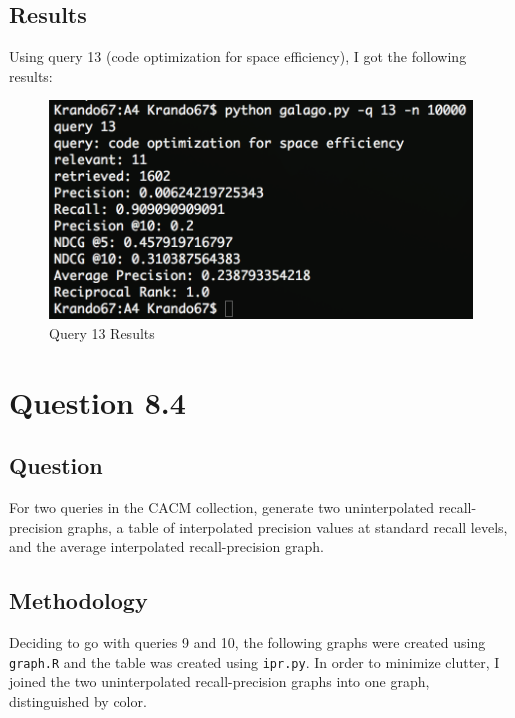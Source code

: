 \documentclass[10pt,letterpaper,bibliography=totoc]{scrartcl}
\begin{document}
\subsection{Results}
Using query 13 (code optimization for space efficiency), I got the following results:
\begin{figure}[h!]
\centering
\label{fig:q13}
\includegraphics[scale=.5]{query13.png}
\caption{Query 13 Results}
\end{figure}

\section{Question 8.4}
\subsection {Question}
For two queries in the CACM collection, generate two uninterpolated recall-precision graphs, a table of interpolated precision values at standard recall levels, and the average interpolated recall-precision graph.

\subsection{Methodology}
Deciding to go with queries 9 and 10, the following graphs were created using \texttt{graph.R} and the table was created using \texttt{ipr.py}. In order to minimize clutter, I joined the two uninterpolated recall-precision graphs into one graph, distinguished by color.
\end{document}
